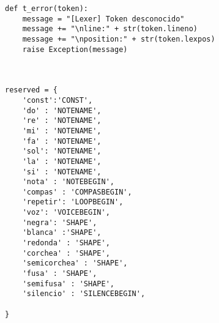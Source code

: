 \begin{verbatim}
def t_error(token):
    message = "[Lexer] Token desconocido"
    message += "\nline:" + str(token.lineno)
    message += "\nposition:" + str(token.lexpos)
    raise Exception(message)



reserved = {
    'const':'CONST',
    'do' : 'NOTENAME',
    're' : 'NOTENAME',
    'mi' : 'NOTENAME',
    'fa' : 'NOTENAME',
    'sol': 'NOTENAME',
    'la' : 'NOTENAME',
    'si' : 'NOTENAME',
    'nota' : 'NOTEBEGIN',
    'compas' : 'COMPASBEGIN',
    'repetir': 'LOOPBEGIN',
    'voz': 'VOICEBEGIN',
    'negra': 'SHAPE',
    'blanca' :'SHAPE',
    'redonda' : 'SHAPE',
    'corchea' : 'SHAPE',
    'semicorchea' : 'SHAPE',
    'fusa' : 'SHAPE',
    'semifusa' : 'SHAPE',
    'silencio' : 'SILENCEBEGIN',

}
\end{verbatim}